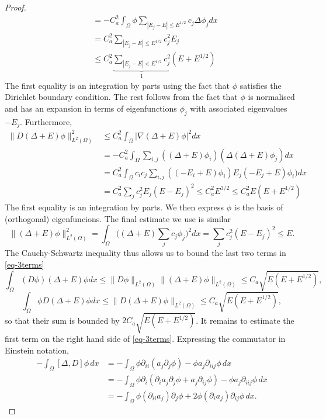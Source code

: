 \documentclass{article}
\begin{document}
\begin{proof}
\begin{align*}
& = -C_a^2 \int_{\Omega} \phi \sum_{|E_j - E| \le E^{1/2}} c_j \Delta \phi_j dx
\\
& = C_a^2 \sum_{|E_j - E| \le E^{1/2}} c_j^2 E_j \\
& \le C_a^2 \underbrace{\sum_{|E_j - E| < E^{1/2}} c_j^2}_1 (E + E^{1/2})
\end{align*}
The first equality is an integration by parts using the fact that $\phi$ satisfies the Dirichlet boundary condition.
The rest follows from the fact that $\phi$ is normalised and has an expansion in terms of eigenfunctions $\phi_j$ with associated eigenvalues $-E_j$.
Furthermore,
\begin{align*}
\lVert D(\Delta + E)\phi\rVert_{L^2(\Omega)}^2 & \le C_a^2 \int_{\Omega} \lvert \nabla (\Delta + E) \phi\rvert^2 dx \\
& = -C_a^2 \int_{\Omega} \sum_{i,j} ((\Delta + E) \phi_i) (\Delta (\Delta + E) \phi_j) dx \\
& = C_a^2 \int_{\Omega} c_i c_j \sum_{i,j} ((-E_i + E) \phi_i) E_j (-E_j + E) \phi_i) dx \\
& = C_a^2 \sum_j c_j^2 E_j (E-E_j)^2
\le C_a^2 E^{3/2}
\le C_a^2 E (E + E^{1/2})
\end{align*}
The first equality is an integration by parts. We then express $\phi$ is the basis of (orthogonal) eigenfuncions.
The final estimate we use is similar
\[
\lVert (\Delta + E) \phi \rVert_{L^2(\Omega)}^2
= \int_{\Omega} \Big((\Delta + E)\sum_j c_j \phi_j\Big)^2 dx
= \sum_j c_j^2 (E-E_j)^2 \le E.
\]
The Cauchy-Schwartz inequality thus allows us to bound the last two terms in \eqref{eq-3terms}
\[
\int_{\Omega} (D \phi) (\Delta + E)\phi dx \le \lVert D\phi \rVert_{L^2(\Omega)} \lVert (\Delta + E) \phi \rVert_{L^2(\Omega)}
\le C_a \sqrt{E(E + E^{1/2})},
\]
\[
\int_{\Omega} \phi D(\Delta + E) \phi dx \le \lVert D(\Delta + E) \phi \rVert_{L^2(\Omega)} \le C_a \sqrt{E (E + E^{1/2})},
\]
so that their sum is bounded by $2 C_a \sqrt{E (E+E^{1/2})}$.
It remains to estimate the first term on the right hand side of \eqref{eq-3terms}.
Expressing the commutator in Einstein notation,
\begin{align*}
- \int_{\Omega} [\Delta, D] \phi \, dx
& = -\int_{\Omega} \phi \partial_{ii} (a_j \partial_j \phi) - \phi a_j \partial_{iij} \phi \, dx \\
& = - \int_{\Omega} \phi \partial_i (\partial_i a_j \partial_j \phi + a_j \partial_{ij} \phi) - \phi a_j \partial_{iij} \phi \, dx \\
& = - \int_{\Omega} \phi (\partial_{ii} a_j) \partial_j \phi + 2 \phi (\partial_i a_j) \partial_{ij} \phi \, dx.

\end{align*}
\end{proof}
\end{document}
